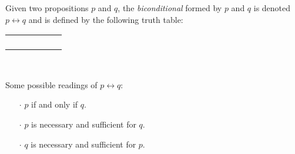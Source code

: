 \begin{definition}[Biconditional]
    \begin{center}
        \begin{minipage}[t]{.55\linewidth}
            Given two propositions \(p\) and \(q\), the \emph{biconditional} formed by \(p\) and \(q\)
            is denoted \(p \leftrightarrow q\) and is defined by the following truth table:
            \begin{table}[H]
                \centering
                \label{tab:iff}
                \begin{tabular}{|CcCc||Cc|}
                    \hline
                     &  &  \\ \hline
                    \thead{\(\top\)} & \thead{\(\top\)} &  \\
                    \thead{\(\top\)} & \thead{\(\bot\)} &  \\
                    \thead{\(\bot\)} & \thead{\(\top\)} &  \\
                    \thead{\(\bot\)} & \thead{\(\bot\)} &  \\ \hline
                \end{tabular}
            \end{table}
        \end{minipage}%
        \begin{minipage}[t]{.05\linewidth}
            ~
        \end{minipage}%
        \begin{minipage}[t]{.4\linewidth}
            Some possible readings of \(p \leftrightarrow q\):\\
            \begin{itemize}
                \item[\(\cdot\)]
                    \(p\) if and only if \(q\).
                \item[\(\cdot\)]
                    \(p\) is necessary and sufficient for \(q\).
                \item[\(\cdot\)]
                    \(q\) is necessary and sufficient for \(p\).
            \end{itemize}
        \end{minipage}
    \end{center}
\end{definition}

